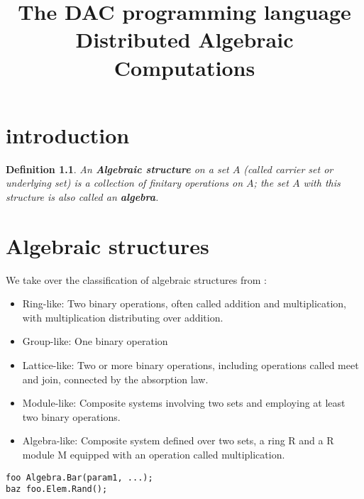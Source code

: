 \documentclass{amsbook}
\title{
  The DAC programming language \\
  \large Distributed Algebraic Computations}
\newtheorem{definition}{Definition}
\begin{document}
\begin{titlepage}
  \maketitle
  \thispagestyle{empty}
\end{titlepage}

\tableofcontents
\thispagestyle{empty}
\newpage

\chapter{introduction}


\begin{definition}
\cite{wiki:algebraicStructure} An \textbf{Algebraic structure} on a set $A$ (called carrier set or underlying set) is a collection of finitary operations on $A$; the set $A$ with this structure is also called an \textbf{algebra}.
\end{definition}

\chapter{Algebraic structures}
We take over the classification of algebraic structures from \cite{wiki:algebraicStructure}:

\begin{itemize}
\item Ring-like: Two binary operations, often called addition and multiplication, with multiplication distributing over addition. 
\item Group-like: One binary operation
\item Lattice-like: Two or more binary operations, including operations called meet and join, connected by the absorption law.
\item Module-like: Composite systems involving two sets and employing at least two binary operations.
\item Algebra-like: Composite system defined over two sets, a ring R and a R module M equipped with an operation called multiplication.
\end{itemize}

\begin{verbatim}
foo Algebra.Bar(param1, ...);
baz foo.Elem.Rand();
\end{verbatim}
\end{document}
